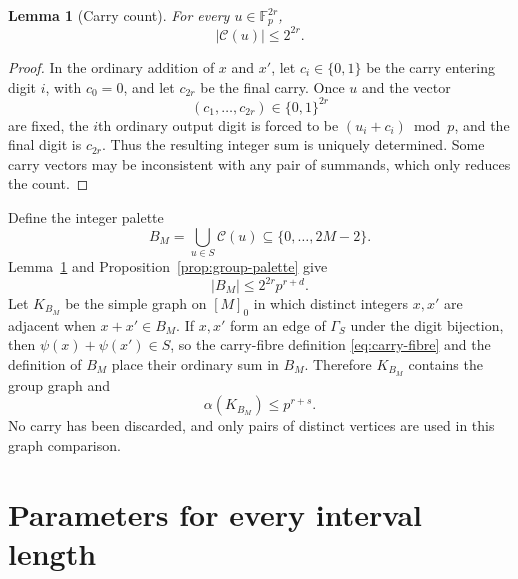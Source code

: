 \documentclass[11pt]{article}
\numberwithin{equation}{section}
\newtheorem{lemma}[theorem]{Lemma}
\theoremstyle{definition}
\theoremstyle{remark}
\newcommand{\F}{\mathbb F}
\newcommand{\calC}{\mathcal C}
\begin{document}
\begin{lemma}[Carry count]\label{lem:carry}
For every $u\in\F_p^{2r}$,
\[
 |\calC(u)|\le2^{2r}.
\]
\end{lemma}

\begin{proof}
In the ordinary addition of $x$ and $x'$, let $c_i\in\{0,1\}$ be the
carry entering digit $i$, with $c_0=0$, and let $c_{2r}$ be the final
carry.  Once $u$ and the vector
\[
 (c_1,\ldots,c_{2r})\in\{0,1\}^{2r}
\]
are fixed, the $i$th ordinary output digit is forced to be
$(u_i+c_i)\bmod p$, and the final digit is $c_{2r}$.  Thus the resulting
integer sum is uniquely determined.  Some carry vectors may be
inconsistent with any pair of summands, which only reduces the count.
\end{proof}

Define the integer palette
\[
 B_M=\bigcup_{u\in S}\calC(u)\subseteq\{0,\ldots,2M-2\}.
\]
Lemma~\ref{lem:carry} and Proposition~\ref{prop:group-palette} give
\[
 |B_M|\le2^{2r}p^{r+d}.
\]
Let $K_{B_M}$ be the simple graph on $[M]_0$ in which distinct integers
$x,x'$ are adjacent when $x+x'\in B_M$.  If $x,x'$ form an edge of
$\Gamma_S$ under the digit bijection, then
$\psi(x)+\psi(x')\in S$, so the carry-fibre definition
\eqref{eq:carry-fibre} and the definition of $B_M$ place their ordinary sum
in $B_M$.  Therefore $K_{B_M}$ contains the group
graph and
\[
 \alpha(K_{B_M})\le p^{r+s}.
\]
No carry has been discarded, and only pairs of distinct vertices are
used in this graph comparison.

\section{Parameters for every interval length}\label{sec:all-N}
\end{document}
